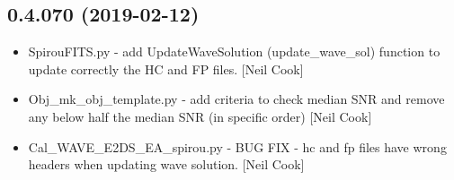 \documentclass[a4paper,10pt,english]{report}
\begin{document}
\subsection{0.4.070 (2019-02-12)}
\label{\detokenize{misc/changelog:id186}}\begin{itemize}
\item {} 
SpirouFITS.py - add UpdateWaveSolution (update\_wave\_sol) function to
update correctly the HC and FP files. {[}Neil Cook{]}

\item {} 
Obj\_mk\_obj\_template.py - add criteria to check median SNR and remove
any below half the median SNR (in specific order) {[}Neil Cook{]}

\item {} 
Cal\_WAVE\_E2DS\_EA\_spirou.py - BUG FIX - hc and fp files have wrong
headers when updating wave solution. {[}Neil Cook{]}

\end{itemize}
\end{document}
